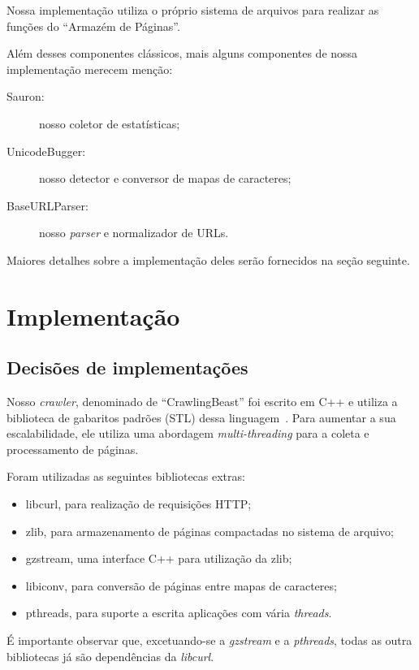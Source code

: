 \documentclass[10pt,twocolumn]{article}
\begin{document}
Nossa implementação utiliza o próprio sistema de arquivos para realizar
as funções do ``Armazém de Páginas''.

Além desses componentes clássicos, mais alguns componentes de nossa
implementação merecem menção:
\begin{description}
\item[Sauron:] nosso coletor de estatísticas;
\item[UnicodeBugger:] nosso detector e conversor de mapas de caracteres;
\item[BaseURLParser:] nosso \emph{parser} e normalizador de URLs.
\end{description}

Maiores detalhes sobre a implementação deles serão fornecidos na seção
seguinte.


\section{Implementação}\label{sec:implementation}

\subsection{Decisões de implementações}

Nosso \emph{crawler}, denominado de ``CrawlingBeast'' foi escrito em C++
e utiliza a biblioteca de gabaritos padrões (STL) dessa
linguagem~\cite{stroustrup97}. Para aumentar a sua escalabilidade, ele
utiliza uma abordagem \emph{multi-threading} para a coleta e
processamento de páginas.

Foram utilizadas as seguintes bibliotecas extras:
\begin{itemize}
\item libcurl, para realização de requisições HTTP;
\item zlib, para armazenamento de páginas compactadas no sistema de
arquivo;
\item gzstream, uma interface C++ para utilização da zlib;
\item libiconv, para conversão de páginas entre mapas de caracteres;
\item pthreads, para suporte a escrita aplicações com vária
\emph{threads}.
\end{itemize}

É importante observar que, excetuando-se a \emph{gzstream} e a
\emph{pthreads}, todas as outra bibliotecas já são dependências da
\emph{libcurl}.
\end{document}
